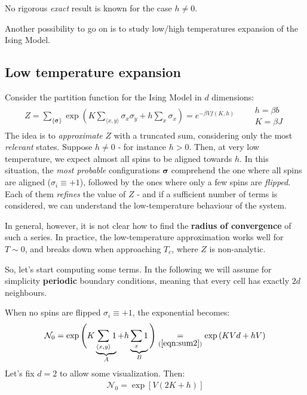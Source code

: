 \documentclass[../../main.tex]{subfiles}
\begin{document}
\medskip

No rigorous \textit{exact} result is known for the case $h \neq 0$. 

\medskip

Another possibility to go on is to study low/high temperatures expansion of the Ising Model. 



\subsection{Low temperature expansion}
Consider the partition function for the Ising Model in $d$ dimensions:
\begin{align}\label{eqn:Z-again}
    Z= \sum_{\{\bm{\sigma}\}} \exp\left(K \sum_{\langle x,y \rangle} \sigma_x \sigma_y + h \sum_x \sigma_x\right) = e^{-\beta V f(K,h)} \qquad \substack{h = \beta b\\K = \beta J}
\end{align}
The idea is to \textit{approximate} $Z$ with a truncated sum, considering only the most \textit{relevant} states. Suppose $h\neq 0$ - for instance $h > 0$. Then, at very low temperature, we expect almost all spins to be aligned towards $h$. In this situation, the \textit{most probable} configurations $\bm{\sigma}$ comprehend the one where all spins are aligned ($\sigma_i \equiv +1$), followed by the ones where only a few spins are \textit{flipped}. Each of them \textit{refines} the value of $Z$ - and if a sufficient number of terms is considered, we can understand the low-temperature behaviour of the system.

\medskip

In general, however, it is not clear how to find the \textbf{radius of convergence} of such a series. In practice, the low-temperature approximation works well for $T \sim 0$, and breaks down when approaching $T_c$, where $Z$ is non-analytic.  

\medskip

So, let's start computing some terms. In the following we will assume for simplicity \textbf{periodic} boundary conditions, meaning that every cell has exactly $2d$ neighbours.


When no spins are flipped $\sigma_i \equiv +1$, the exponential becomes:
\begin{align}\label{eqn:term1}
    \mathcal{N}_0 =\exp\Bigg(K \underbrace{\sum_{\langle x,y \rangle} 1 }_{A}+ h \underbrace{\sum_x 1}_{B}\Bigg) \underset{(\ref{eqn:sum2})}{=}  \exp\left(K V d + h V\right)
\end{align}  
Let's fix $d=2$ to allow some visualization. Then:
\begin{align}\label{eqn:term0}
    \mathcal{N}_0 = \exp[V(2K + h)]
\end{align}
\end{document}
